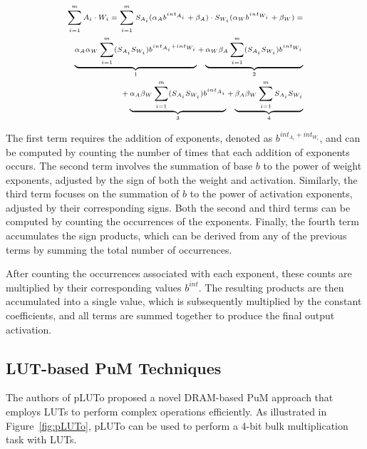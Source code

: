 \begin{equation}
\begin{scriptsize}
\begin{aligned}
\label{eqn:conv_extended}
\sum_{i=1}^{m} A_{i} \cdot W_{i} = \sum_{i=1}^{m}S_{A_{i}} (\alpha_{A} b^{int_{A_{i}}} + \beta_{A}) \cdot S_{W_{i}} (\alpha_{W} b^{int_{W_{i}}} + \beta_{W}) =\\
\underbrace{\alpha_{A}\alpha_{W}\sum_{i=1}^{m} (S_{A_{i}} S_{W_{i}})b^{int_{A_{i}} + int_{W_{i}}}}_\text{1} + \underbrace{\alpha_{W}\beta_{A}\sum_{i=1}^{m}(S_{A_{i}} S_{W_{i}})b^{int_{W_{i}}}}_\text{2} \\
+ \underbrace{\alpha_{A}\beta_{W}\sum_{i=1}^{m}( S_{A_{i}} S_{W_{i}}) b^{int_{A_{i}}}}_\text{3} + \underbrace{\beta_{A}\beta_{W}\sum_{i=1}^{m}S_{A_{i}} S_{W_{i}}}_\text{4}
\end{aligned}
\end{scriptsize}
\end{equation}

The first term requires the addition of exponents, denoted as $b^{int_{A_{i}} + int_{W_{i}}}$, and can be computed by counting the number of times that each addition of exponents occurs. The second term involves the summation of base $b$ to the power of weight exponents, adjusted by the sign of both the weight and activation. Similarly, the third term focuses on the summation of $b$ to the power of activation exponents, adjusted by their corresponding signs. Both the second and third terms can be computed by counting the occurrences of the exponents. Finally, the fourth term accumulates the sign products, which can be derived from any of the previous terms by summing the total number of occurrences.

After counting the occurrences associated with each exponent, these counts are multiplied by their corresponding values $b^{int}$. The resulting products are then accumulated into a single value, which is subsequently multiplied by the constant coefficients, and all terms are summed together to produce the final output activation.

\subsection{LUT-based PuM Techniques}\label{pluto_background}
The authors of pLUTo \cite{pluto} proposed a novel DRAM-based PuM approach that employs LUTs to perform complex operations efficiently. As illustrated in Figure~\ref{fig:pLUTo}, pLUTo can be used to perform a 4-bit bulk multiplication task with LUTs.

